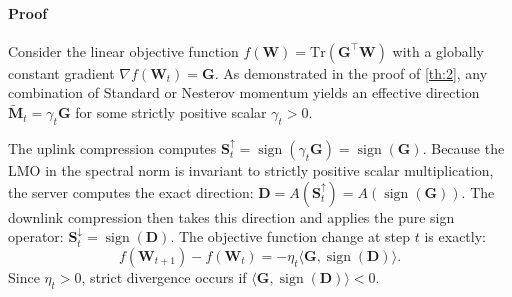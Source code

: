 \documentclass[letterpaper]{article} %
\begin{document}
\paragraph{Proof} 
Consider the linear objective function $f(\mathbf{W}) = \mathrm{Tr}(\mathbf{G}^\top \mathbf{W})$ with a globally constant gradient $\nabla f(\mathbf{W}_t) = \mathbf{G}$. 
As demonstrated in the proof of \cref{th:2}, any combination of Standard or Nesterov momentum yields an effective direction $\tilde{\mathbf{M}}_t = \gamma_t \mathbf{G}$ for some strictly positive scalar $\gamma_t > 0$.

The uplink compression computes $\mathbf{S}_t^{\uparrow} = \operatorname{sign}(\gamma_t \mathbf{G}) = \operatorname{sign}(\mathbf{G})$. 
Because the LMO in the spectral norm is invariant to strictly positive scalar multiplication, the server computes the exact direction: $\mathbf{D} = A(\mathbf{S}_t^{\uparrow}) = A(\operatorname{sign}(\mathbf{G}))$.
The downlink compression then takes this direction and applies the pure sign operator: $\mathbf{S}_t^{\downarrow} = \operatorname{sign}(\mathbf{D})$.
The objective function change at step $t$ is exactly:
\begin{equation}
f(\mathbf{W}_{t+1}) - f(\mathbf{W}_t) = -\eta_t  \langle \mathbf{G}, \operatorname{sign}(\mathbf{D}) \rangle.
\end{equation}
Since $\eta_t > 0$, strict divergence occurs if $\langle \mathbf{G}, \operatorname{sign}(\mathbf{D}) \rangle < 0$.
\end{document}

